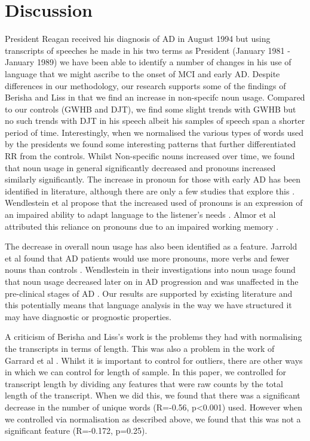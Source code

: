 \documentclass[12pt]{article}
\begin{document}
\section{Discussion}\label{discussion}
President Reagan received his diagnosis of AD in August 1994 but using transcripts of speeches he made in his two terms as President (January 1981 - January 1989) we have been able to identify a number of changes in his use of language that we might ascribe to the onset of MCI and early AD. Despite differences in our methodology, our research supports some of the findings of Berisha and Liss in that we find an increase in non-specifc noun usage. Compared to our controls (GWHB and DJT), we find some slight trends with GWHB but no such trends with DJT in his speech albeit his samples of speech span a shorter period of time. Interestingly, when we normalised the various types of words used by the presidents we found some interesting patterns that further differentiated RR from the controls. Whilst Non-specific nouns increased over time, we found that noun usage in general significantly decreased and pronouns increased similarly significantly. The increase in pronoun for those with early AD has been identified in literature, although there are only a few studies that explore this \cite{Wendelstein2015}. Wendlestein et al propose that the increased used of pronouns is an expression of an impaired ability to adapt language to the listener's needs \cite{Wendelstein2015}. Almor et al attributed this reliance on pronouns due to an impaired working memory \cite{Almor1999}.
\par 
The decrease in overall noun usage has also been identified as a feature. Jarrold et al found that AD patients would use more pronouns, more verbs and fewer nouns than controls \cite{Jarrold2014}. Wendlestein in their investigations into noun usage found that noun usage decreased later on in AD progression and was unaffected in the pre-clinical stages of AD \cite{Wendelstein2014}. Our results are supported by existing literature and this potentially means that language analysis in the way we have structured it may have diagnostic or prognostic properties.
\par 
A criticism of Berisha and Liss's work is the problems they had with normalising the transcripts in terms of length. This was also a problem in the work of Garrard et al \cite{Garrard2005, Le2011}. Whilst it is important to control for outliers, there are other ways in which we can control for length of sample. In this paper, we controlled for transcript length by dividing any features that were raw counts by the total length of the transcript. When we did this, we found that there was a significant decrease in the number of unique words (R=-0.56, p\textless0.001) used. However when we controlled via normalisation as described above, we found that this was not a significant feature (R=-0.172, p=0.25). 
\end{document}
